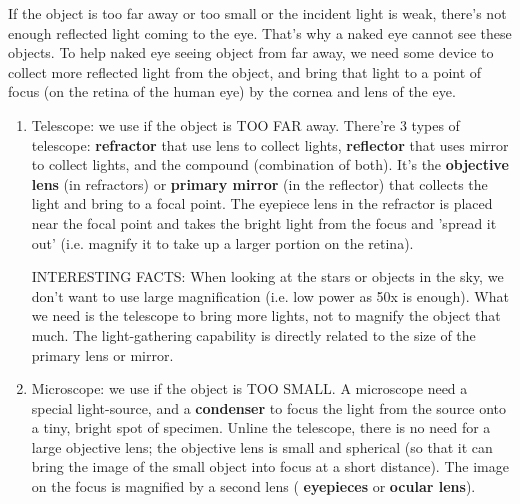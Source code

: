 If the object is too far away or too small or the incident light is weak,
there's not enough reflected light coming to the eye. That's why a naked eye
cannot see these objects. To help naked eye seeing object from far away, we need
some device to collect more reflected light from the object, and bring that
light to a point of focus (on the retina of the human eye) by the cornea and
lens of the eye.

\begin{enumerate}
  \item Telescope: we use if the object is TOO FAR away. There're 3 types of
  telescope:
  {\bf refractor} that use lens to collect lights, {\bf reflector} that uses
  mirror to collect lights, and the compound (combination of both).   It's the
  {\bf objective lens} (in refractors) or {\bf primary mirror} (in the
  reflector) that collects the light and bring to a focal point. The eyepiece
  lens in the refractor is placed near the focal point and takes the bright
  light from the focus and 'spread it out' (i.e. magnify it to take up a larger
  portion on the retina).
  
\begin{framed}
INTERESTING FACTS: When looking at the stars or objects in the sky, we don't
want to use large magnification (i.e. low power as 50x is enough). What we need
is the telescope to bring more lights, not to magnify the object that much. The
light-gathering capability is directly related to the size of the primary lens
or mirror.
\end{framed}  

  \item Microscope: we use if the object is TOO SMALL. A microscope need a
  special light-source, and a {\bf condenser} to focus the
light from the source onto a tiny, bright spot of specimen. Unline the
telescope,
  there is no need for a large objective lens; the objective lens is small and
  spherical (so that it can bring the image of the small object into focus at a
  short distance). The image on the focus is magnified by a second lens ({\bf
  eyepieces} or {\bf ocular lens}).
\end{enumerate}
 
